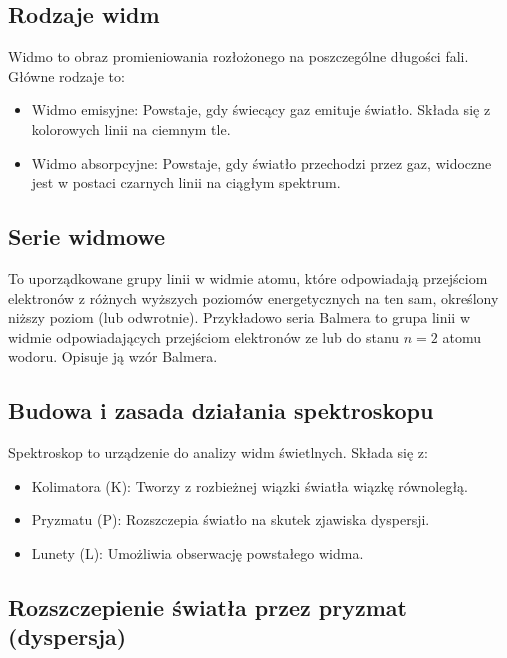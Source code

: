 \documentclass[a4paper,12pt]{article}
\begin{document}
\subsection*{Rodzaje widm}

Widmo to obraz promieniowania rozłożonego na poszczególne długości fali. Główne rodzaje to:

\begin{itemize}
    \item Widmo emisyjne: Powstaje, gdy świecący gaz emituje światło. Składa się z kolorowych linii na ciemnym tle.

    \item Widmo absorpcyjne: Powstaje, gdy światło przechodzi przez gaz, widoczne jest w postaci czarnych linii na ciągłym spektrum.~\cite{fizyka_dla_szkół_wyższych_tom_3}
\end{itemize}


\subsection*{Serie widmowe}

To uporządkowane grupy linii w widmie atomu, które odpowiadają przejściom elektronów z różnych wyższych poziomów energetycznych na ten sam, określony niższy poziom (lub odwrotnie). Przykładowo seria Balmera to grupa linii w widmie odpowiadających przejściom elektronów ze lub do stanu $n=2$ atomu wodoru. Opisuje ją wzór Balmera. ~\cite{fizyka_dla_szkół_wyższych_tom_3}

\subsection*{Budowa i zasada działania spektroskopu}

Spektroskop to urządzenie do analizy widm świetlnych. Składa się z:

\begin{itemize}
    \item Kolimatora (K): Tworzy z rozbieżnej wiązki światła wiązkę równoległą.

    \item Pryzmatu (P): Rozszczepia światło na skutek zjawiska dyspersji.

    \item Lunety (L): Umożliwia obserwację powstałego widma.
\end{itemize}

\subsection*{Rozszczepienie światła przez pryzmat (dyspersja)}
\end{document}
